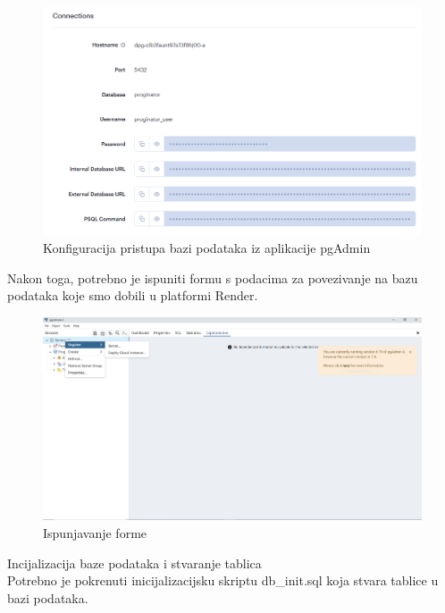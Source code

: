 \begin{packed_item}
		\begin{figure}[H]
			\includegraphics[width=\textwidth]{slike/Baza_podataka2.PNG} %
			\caption{Konfiguracija pristupa bazi podataka iz aplikacije pgAdmin}
			\label{fig:bazapodataka2} %
		\end{figure}
		
		Nakon toga, potrebno je ispuniti formu s podacima za povezivanje na bazu podataka koje smo dobili u platformi Render.
		\begin{figure}[H]
			\includegraphics[width=\textwidth]{slike/Baza_podataka3.PNG} %
			\caption{Ispunjavanje forme}
			\label{fig:bazapodataka3} %
		\end{figure}
		
        \item Incijalizacija baze podataka i stvaranje tablica \\
        
        Potrebno je pokrenuti inicijalizacijsku skriptu db\_init.sql koja stvara tablice u bazi podataka.

    				
	 \end{packed_item}


